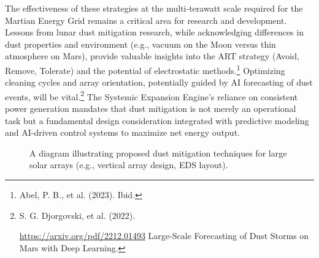 \documentclass[fontsize=10pt, oneside, DIV=calc]{scrartcl}
\begin{document}
\medskip

\noindent
The effectiveness of these strategies at the multi-terawatt scale required for the Martian Energy Grid remains a critical area for research and development. Lessons from lunar dust mitigation research, while acknowledging differences in dust properties and environment (e.g., vacuum on the Moon versus thin atmosphere on Mars), provide valuable insights into the ART strategy (Avoid, Remove, Tolerate) and the potential of electrostatic methods.\footnote{Abel, P. B., et al. (2023). Ibid.} Optimizing cleaning cycles and array orientation, potentially guided by AI forecasting of dust events, will be vital.\footnote{S. G. Djorgovski, et al. (2022). 







\href{https://arxiv.org/pdf/2212.01493}\url{https://arxiv.org/pdf/2212.01493} Large-Scale Forecasting of Dust Storms on Mars with Deep Learning.} The Systemic Expansion Engine's reliance on consistent power generation mandates that dust mitigation is not merely an operational task but a fundamental design consideration integrated with predictive modeling and AI-driven control systems to maximize net energy output.

\medskip



\begin{figure}[H]
  \centering
  \noindent
  \begin{minipage}{\textwidth}
    \centering
    \caption{A diagram illustrating proposed dust mitigation techniques for large solar arrays (e.g., vertical array design, EDS layout).}
  \end{minipage}
\end{figure}
\end{document}
